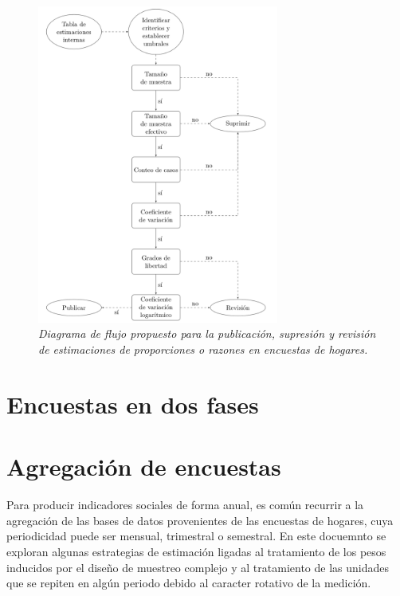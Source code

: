 \documentclass[
  12pt,
  spanish,
]{book}
\begin{document}
\begin{figure}
\centering
\includegraphics[width=3.125in,height=\textheight]{Pics/CSj1.png}
\caption{\emph{Diagrama de flujo propuesto para la publicación, supresión y revisión de estimaciones de proporciones o razones en encuestas de hogares.}}
\end{figure}

\hypertarget{encuestas-en-dos-fases}{%
\chapter{Encuestas en dos fases}\label{encuestas-en-dos-fases}}

\hypertarget{agregaciuxf3n-de-encuestas}{%
\chapter{Agregación de encuestas}\label{agregaciuxf3n-de-encuestas}}

Para producir indicadores sociales de forma anual, es común recurrir a la agregación de las bases de datos provenientes de las encuestas de hogares, cuya periodicidad puede ser mensual, trimestral o semestral. En este docuemnto se exploran algunas estrategias de estimación ligadas al tratamiento de los pesos inducidos por el diseño de muestreo complejo y al tratamiento de las unidades que se repiten en algún periodo debido al caracter rotativo de la medición.
\end{document}
